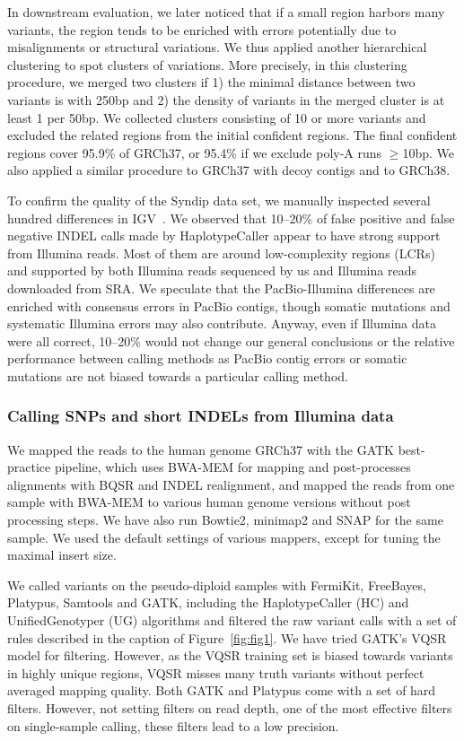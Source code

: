 \documentclass{bioinfo}
\begin{document}
\begin{methods}
In downstream evaluation, we later noticed that if a small region harbors many
variants, the region tends to be enriched with errors potentially due to
misalignments or structural variations.  We thus applied another hierarchical
clustering to spot clusters of variations.  More precisely, in this clustering
procedure, we merged two clusters if 1) the minimal distance between two
variants is with 250bp and 2) the density of variants in the merged cluster is
at least 1 per 50bp. We collected clusters consisting of 10 or more variants
and excluded the related regions from the initial confident regions. The final
confident regions cover 95.9\% of GRCh37, or 95.4\% if we exclude poly-A runs
$\ge$10bp. We also applied a similar procedure to GRCh37 with decoy contigs and
to GRCh38.

To confirm the quality of the Syndip data set, we manually inspected several
hundred differences in IGV~\citep{Robinson:2011uo}. We observed that 10--20\%
of false positive and false negative INDEL calls made by HaplotypeCaller appear
to have strong support from Illumina reads. Most of them are around
low-complexity regions (LCRs) and supported by both Illumina reads sequenced by
us and Illumina reads downloaded from SRA. We speculate that the
PacBio-Illumina differences are enriched with consensus errors in PacBio
contigs, though somatic mutations and systematic Illumina errors may also
contribute. Anyway, even if Illumina data were all correct, 10--20\% would not
change our general conclusions or the relative performance between calling
methods as PacBio contig errors or somatic mutations are not biased towards a
particular calling method.

\subsubsection*{Calling SNPs and short INDELs from Illumina data}

We mapped the reads to the human genome GRCh37 with the GATK best-practice
pipeline, which uses BWA-MEM for mapping and post-processes alignments with
BQSR and INDEL realignment, and mapped the reads from one sample with BWA-MEM
to various human genome versions without post processing steps. We have also
run Bowtie2, minimap2 and SNAP for the same sample. We used the default
settings of various mappers, except for tuning the maximal insert size.

We called variants on the pseudo-diploid samples with FermiKit, FreeBayes,
Platypus, Samtools and GATK, including the HaplotypeCaller (HC) and
UnifiedGenotyper (UG) algorithms and filtered the raw variant calls with a set
of rules described in the caption of Figure~\ref{fig:fig1}.  We have tried
GATK's VQSR model for filtering. However, as the VQSR training set is biased
towards variants in highly unique regions, VQSR misses many truth variants
without perfect averaged mapping quality. Both GATK and Platypus come with a
set of hard filters. However, not setting filters on read depth, one of the
most effective filters on single-sample calling, these filters lead to a low
precision.


\end{methods}
\end{document}
